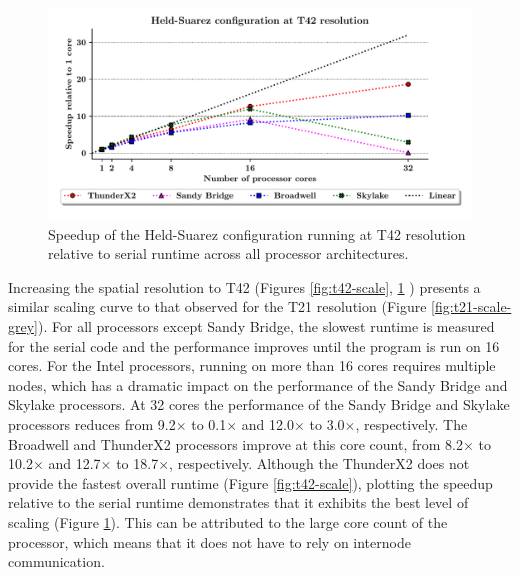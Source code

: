 \documentclass[a4paper,11pt]{report}
\begin{document}
\newpage
\begin{figure}[htbp]
\begin{center}
\includegraphics[width=1\linewidth]{img/speedup-T42-Held_suarez.pdf}
\caption[Speedup of the Held-Suarez configuration at T42 resolution]{Speedup of the Held-Suarez configuration running at T42 resolution relative to serial runtime across all processor architectures.}
\label{fig:held-t42-speedup}
\end{center}
\end{figure}
Increasing the spatial resolution to T42 (Figures \ref{fig:t42-scale}, \ref{fig:held-t42-speedup} ) presents a similar scaling curve to that observed for the T21 resolution (Figure \ref{fig:t21-scale-grey}). For all processors except Sandy Bridge, the slowest runtime is measured for the serial code and the performance improves until the program is run on 16 cores. For the Intel processors, running on more than 16 cores requires multiple nodes, which has a dramatic impact on the performance of the Sandy Bridge and Skylake processors. At 32 cores the performance of the Sandy Bridge and Skylake processors reduces from 9.2$\times$ to 0.1$\times$ and 12.0$\times$ to 3.0$\times$, respectively. The Broadwell and ThunderX2 processors improve at this core count, from 8.2$\times$ to 10.2$\times$ and 12.7$\times$ to 18.7$\times$, respectively. Although the ThunderX2 does not provide the fastest overall runtime (Figure \ref{fig:t42-scale}), plotting the speedup relative to the serial runtime demonstrates that it exhibits the best level of scaling (Figure \ref{fig:held-t42-speedup}). This can be attributed to the large core count of the processor, which means that it does not have to rely on internode communication. 
\end{document}
